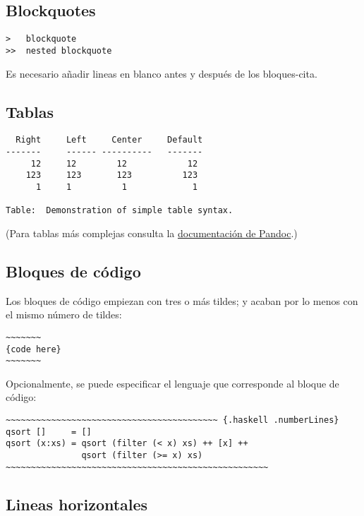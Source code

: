 \documentclass[12pt,es-ES,]{article}
\begin{document}
\subsection{Blockquotes}\label{blockquotes}

\begin{verbatim}
>   blockquote
>>  nested blockquote
\end{verbatim}

Es necesario añadir lineas en blanco antes y después de los
bloques-cita.

\subsection{Tablas}\label{tablas}

\begin{verbatim}
  Right     Left     Center     Default
-------     ------ ----------   -------
     12     12        12            12
    123     123       123          123
      1     1          1             1

Table:  Demonstration of simple table syntax.
\end{verbatim}

(Para tablas más complejas consulta la
\href{http://pandoc.org/README.html\#tables}{documentación de Pandoc}.)

\subsection{Bloques de código}\label{bloques-de-cuxf3digo}

Los bloques de código empiezan con tres o más tildes; y acaban por lo
menos con el mismo número de tildes:

\begin{verbatim}
~~~~~~~
{code here}
~~~~~~~
\end{verbatim}

Opcionalmente, se puede especificar el lenguaje que corresponde al
bloque de código:

\begin{verbatim}
~~~~~~~~~~~~~~~~~~~~~~~~~~~~~~~~~~~~~~~~~~ {.haskell .numberLines}
qsort []     = []
qsort (x:xs) = qsort (filter (< x) xs) ++ [x] ++
               qsort (filter (>= x) xs)
~~~~~~~~~~~~~~~~~~~~~~~~~~~~~~~~~~~~~~~~~~~~~~~~~~~~
\end{verbatim}

\subsection{Lineas horizontales}\label{lineas-horizontales}
\end{document}
